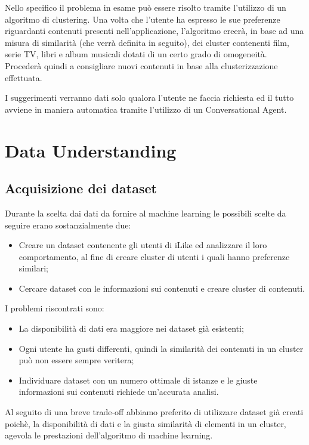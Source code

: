 \documentclass[a4paper, 12pt]{report}
\begin{document}
            Nello specifico il problema in esame può essere risolto tramite l’utilizzo di un algoritmo di clustering.
            Una volta che l’utente ha espresso le sue preferenze riguardanti contenuti presenti nell’applicazione, l’algoritmo
            creerà, in base ad una misura di similarità (che verrà definita in seguito), dei cluster contenenti film, serie TV,
            libri e album musicali dotati di un certo grado di omogeneità.
            Procederà quindi a consigliare nuovi contenuti in base alla clusterizzazione effettuata.

            I suggerimenti verranno dati solo qualora l’utente ne faccia richiesta ed il tutto avviene in maniera
            automatica tramite l’utilizzo di un Conversational Agent.

    \chapter{Data Understanding}\label{ch:data-understanding}

        \section{Acquisizione dei dataset}\label{sec:acquisizione-dei-dataset}
            Durante la scelta dai dati da fornire al machine learning le possibili scelte da seguire erano sostanzialmente due:
            \begin{itemize}
                \item Creare un dataset contenente gli utenti di iLike ed analizzare il loro comportamento, al fine di creare
                      cluster di utenti i quali hanno preferenze similari;
                \item Cercare dataset con le informazioni sui contenuti e creare cluster di contenuti.
            \end{itemize}

            I problemi riscontrati sono:
            \begin{itemize}
                \item La disponibilità di dati era maggiore nei dataset già esistenti;
                \item Ogni utente ha gusti differenti, quindi la similarità dei contenuti in un cluster può non essere sempre
                      veritera;
                \item Individuare dataset con un numero ottimale di istanze e le giuste informazioni sui contenuti richiede
                      un'accurata analisi.
            \end{itemize}
            Al seguito di una breve trade-off abbiamo preferito di utilizzare dataset già creati poichè, la disponibilità
            di dati e la giusta similarità di elementi in un cluster, agevola le prestazioni dell'algoritmo di machine learning.
\end{document}
